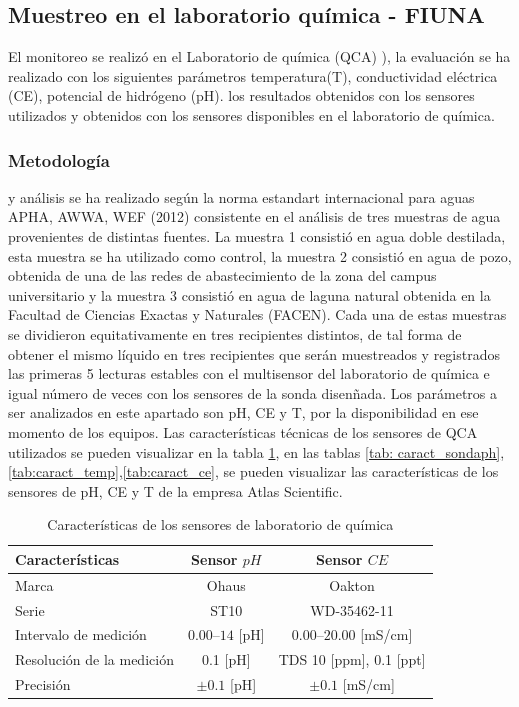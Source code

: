 \subsection{Muestreo en el laboratorio qu\'imica - FIUNA }
El monitoreo se realiz\'o en el Laboratorio de química (QCA) ), la evaluación se ha realizado con los siguientes par\'ametros temperatura(T), conductividad el\'ectrica (CE), potencial de hidr\'ogeno (pH). los resultados obtenidos con los sensores utilizados y obtenidos con los sensores disponibles en el laboratorio de química.

\subsubsection{Metodolog\'ia }
y análisis se ha realizado según la norma estandart internacional para aguas  APHA, AWWA, WEF (2012) consistente en el análisis de tres muestras de agua provenientes de distintas fuentes. La muestra 1 consistió en agua doble destilada, esta muestra se  ha utilizado como control, la muestra 2 consistió en agua de pozo, obtenida de una de las redes de abastecimiento de la zona del campus universitario y la muestra 3 consistió en agua de laguna natural obtenida en la Facultad de Ciencias Exactas y Naturales (FACEN). 
Cada una de estas muestras se dividieron equitativamente en tres recipientes distintos, de tal forma de obtener el mismo l\'iquido en tres recipientes que ser\'an muestreados y registrados las primeras 5 lecturas estables con el multisensor del laboratorio de qu\'imica e igual n\'umero de veces con los sensores de la sonda disen\~nada.
Los par\'ametros a ser analizados en este apartado son pH, CE y T, por la disponibilidad en ese momento de los equipos.
Las caracter\'isticas t\'ecnicas de los sensores de QCA utilizados se pueden visualizar en la tabla \ref{tab: Sensores laboratorio de quimica}, en las tablas \ref{tab: caract_sondaph},\ref{tab:caract_temp},\ref{tab:caract_ce}, se pueden visualizar las características de los sensores de pH, CE y T  de la empresa Atlas Scientific.
\begin{table}[H]
    \caption{Caracter\'isticas de los sensores de laboratorio de qu\'imica}
    \begin{tabular}{l c c}
        \toprule
        Caracter\'isticas & Sensor $pH$ & Sensor  $CE$ \\
        \midrule
        Marca & Ohaus       & Oakton       \\
        Serie & ST10        & WD-35462-11  \\
        Intervalo de medici\'on                      & $0.00 – 14$ {[}pH{]} & $0.00 – 20.00$ {[}mS/cm{]}        \\
        Resoluci\'on de la medici\'on & 0.1   {[}pH{]}     & TDS 10 {[}ppm{]}, 0.1 {[}ppt{]} \\
        Precisi\'on                                  & $\pm0.1$ {[}pH{]}  & $\pm0.1$ {[}mS/cm{]} \\
        \hline
    \end{tabular}
    \label{tab: Sensores laboratorio de quimica}
 \end{table}
